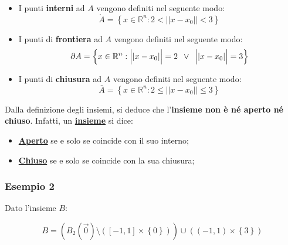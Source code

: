 \documentclass[a4paper]{article}
\begin{document}
	\begin{itemize}
		\item I punti \textbf{interni} ad $A$ vengono definiti nel seguente modo:
		\begin{equation*}
			\mathring{A} = \left\{x \in \mathbb{R}^{n} : 2 < \Big||x-x_{0}|\Big| < 3\right\}
		\end{equation*}
		
		\item I punti di \textbf{frontiera} ad $A$ vengono definiti nel seguente modo:
		\begin{equation*}
			\partial A = \left\{x \in \mathbb{R}^{n} : \Big||x-x_{0}|\Big| = 2 \hspace{0.5em} \lor \hspace{0.5em} \Big||x-x_{0}|\Big| = 3 \right\}
		\end{equation*}
		
		\item I punti di \textbf{chiusura} ad $A$ vengono definiti nel seguente modo:
		\begin{equation*}
			\bar{A} = \left\{x \in \mathbb{R}^{n} : 2 \le \Big||x-x_{0}|\Big| \le 3\right\}
		\end{equation*}
	\end{itemize}

	\noindent
	Dalla definizione degli insiemi, si deduce che l'\textbf{insieme non è né aperto né chiuso}. Infatti, un \textcolor{Red3}{\textbf{\underline{insieme}}} si dice:
	
	\begin{itemize}[label=-]
		\item \textcolor{Red3}{\textbf{\underline{Aperto}}} se e solo se coincide con il suo interno;
		
		\item \textcolor{Red3}{\textbf{\underline{Chiuso}}} se e solo se coincide con la sua chiusura;
	\end{itemize}

	\newpage
	
	\subsubsection[Esempio 2]{\textcolor{Green4}{Esempio 2}}
	
	Dato l'insieme $B$:
	
	\begin{equation*}
		B = \left(B_{2}\left(\overrightarrow{0}\right) \setminus \left(\left[-1,1\right] \times \left\{0\right\}\right)\right) \cup \left(\left(-1,1\right) \times \left\{3\right\}\right)
	\end{equation*}
\end{document}
